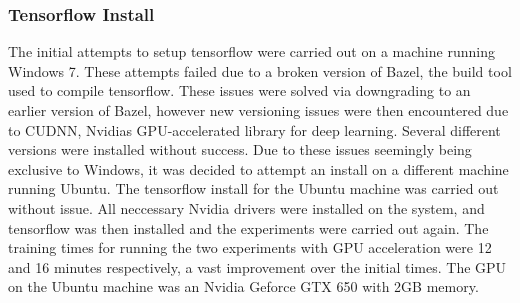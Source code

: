 \documentclass[12pt]{report}
\begin{document}
\subsubsection{Tensorflow Install}
\begin{flushleft}
The initial attempts to setup tensorflow were carried out on a machine running Windows 7. These attempts failed due to a broken version of Bazel, the build tool used to compile tensorflow. These issues were solved via downgrading to an earlier version of Bazel, however new versioning issues were then encountered due to CUDNN, Nvidias GPU-accelerated library for deep learning. Several different versions were installed without success. Due to these issues seemingly being exclusive to Windows, it was decided to attempt an install on a different machine running Ubuntu. The tensorflow install for the Ubuntu machine was carried out without issue. All neccessary Nvidia drivers were installed on the system, and tensorflow was then installed and the experiments were carried out again. The training times for running the two experiments with GPU acceleration were 12 and 16 minutes respectively, a vast improvement over the initial times. The GPU on the Ubuntu machine was an Nvidia Geforce GTX 650 with 2GB memory.
\end{flushleft}
\end{document}
